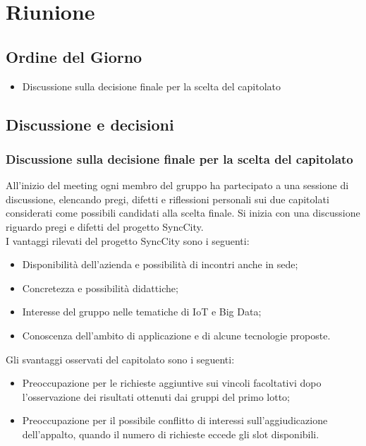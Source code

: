 \section{Riunione}
\subsection{Ordine del Giorno}
\begin{itemize}
	\item Discussione sulla decisione finale per la scelta del capitolato
\end{itemize}

\subsection{Discussione e decisioni}
\subsubsection{Discussione sulla decisione finale per la scelta del capitolato}
All’inizio del meeting ogni membro del gruppo ha partecipato a una sessione di discussione, elencando pregi, difetti e riflessioni personali sui due capitolati considerati come possibili candidati alla scelta finale. Si inizia con una discussione riguardo pregi e difetti del progetto SyncCity.\\
I vantaggi rilevati del progetto SyncCity sono i seguenti:
\begin{itemize}
	\item Disponibilità dell’azienda e possibilità di incontri anche in sede;
	\item Concretezza e possibilità didattiche; 
	\item Interesse del gruppo nelle tematiche di IoT e Big Data;
	\item Conoscenza dell’ambito di applicazione e di alcune tecnologie proposte.
\end{itemize}
Gli svantaggi osservati del capitolato sono i seguenti:
\begin{itemize}
	\item Preoccupazione per le richieste aggiuntive sui vincoli facoltativi dopo l’osservazione dei risultati ottenuti dai gruppi del primo lotto;
	\item Preoccupazione per il possibile conflitto di interessi sull'aggiudicazione dell'appalto, quando il numero di richieste eccede gli slot disponibili.
\end{itemize}

